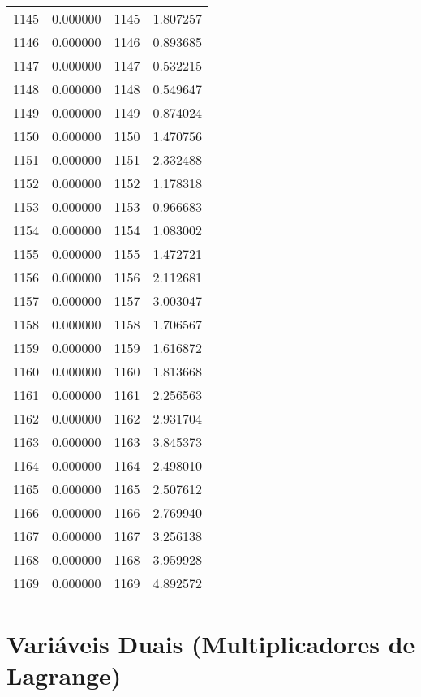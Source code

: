 \documentclass[12pt]{article}
\begin{document}
\begin{longtable}{@{}cccc@{}}
1145 & 0.000000 & 1145 & 1.807257 \\
1146 & 0.000000 & 1146 & 0.893685 \\
1147 & 0.000000 & 1147 & 0.532215 \\
1148 & 0.000000 & 1148 & 0.549647 \\
1149 & 0.000000 & 1149 & 0.874024 \\
1150 & 0.000000 & 1150 & 1.470756 \\
1151 & 0.000000 & 1151 & 2.332488 \\
1152 & 0.000000 & 1152 & 1.178318 \\
1153 & 0.000000 & 1153 & 0.966683 \\
1154 & 0.000000 & 1154 & 1.083002 \\
1155 & 0.000000 & 1155 & 1.472721 \\
1156 & 0.000000 & 1156 & 2.112681 \\
1157 & 0.000000 & 1157 & 3.003047 \\
1158 & 0.000000 & 1158 & 1.706567 \\
1159 & 0.000000 & 1159 & 1.616872 \\
1160 & 0.000000 & 1160 & 1.813668 \\
1161 & 0.000000 & 1161 & 2.256563 \\
1162 & 0.000000 & 1162 & 2.931704 \\
1163 & 0.000000 & 1163 & 3.845373 \\
1164 & 0.000000 & 1164 & 2.498010 \\
1165 & 0.000000 & 1165 & 2.507612 \\
1166 & 0.000000 & 1166 & 2.769940 \\
1167 & 0.000000 & 1167 & 3.256138 \\
1168 & 0.000000 & 1168 & 3.959928 \\
1169 & 0.000000 & 1169 & 4.892572 \\

\end{longtable}

\section{Variáveis Duais (Multiplicadores de Lagrange)}
\end{document}
